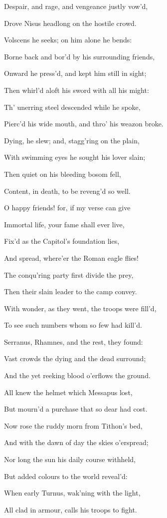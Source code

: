 Despair, and rage, and vengeance justly vow’d,

Drove Nisus headlong on the hostile crowd.

Volscens he seeks; on him alone he bends:

Borne back and bor’d by his surrounding friends,

Onward he press’d, and kept him still in sight;

Then whirl’d aloft his sword with all his might:

Th’ unerring steel descended while he spoke,

Pierc’d his wide mouth, and thro’ his weazon broke.

Dying, he slew; and, stagg’ring on the plain,

With swimming eyes he sought his lover slain;

Then quiet on his bleeding bosom fell,

Content, in death, to be reveng’d so well.

O happy friends! for, if my verse can give

Immortal life, your fame shall ever live,

Fix’d as the Capitol’s foundation lies,

And spread, where’er the Roman eagle flies!

The conqu’ring party first divide the prey,

Then their slain leader to the camp convey.

With wonder, as they went, the troops were fill’d,

To see such numbers whom so few had kill’d.

Serranus, Rhamnes, and the rest, they found:

Vast crowds the dying and the dead surround;

And the yet reeking blood o’erflows the ground.

All knew the helmet which Messapus lost,

But mourn’d a purchase that so dear had cost.

Now rose the ruddy morn from Tithon’s bed,

And with the dawn of day the skies o’erspread;

Nor long the sun his daily course withheld,

But added colours to the world reveal’d:

When early Turnus, wak’ning with the light,

All clad in armour, calls his troops to fight.

